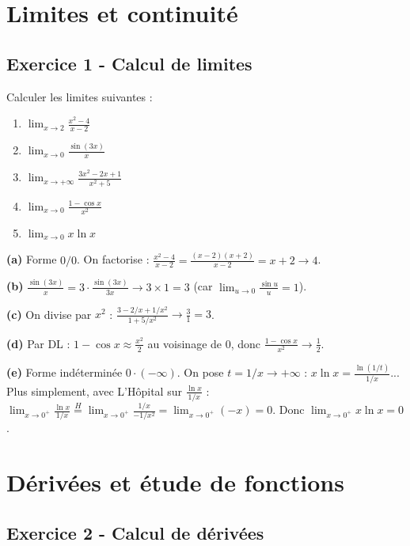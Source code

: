 \documentclass[12pt,a4paper]{article}
\begin{document}
\newpage
\section{Limites et continuité}

\subsection*{Exercice 1 - Calcul de limites \niveau{\facile}}

\begin{boiteexercice}
Calculer les limites suivantes :
\begin{enumerate}[label=(\alph*)]
  \item $\displaystyle\lim_{x\to 2}\frac{x^2-4}{x-2}$
  \item $\displaystyle\lim_{x\to 0}\frac{\sin(3x)}{x}$
  \item $\displaystyle\lim_{x\to+\infty}\frac{3x^2-2x+1}{x^2+5}$
  \item $\displaystyle\lim_{x\to 0}\frac{1-\cos x}{x^2}$
  \item $\displaystyle\lim_{x\to 0}x\ln x$
\end{enumerate}
\end{boiteexercice}

\begin{boitecorrige}
\textbf{(a)} Forme $0/0$. On factorise : $\frac{x^2-4}{x-2}=\frac{(x-2)(x+2)}{x-2}=x+2\to 4$.

\textbf{(b)} $\frac{\sin(3x)}{x}=3\cdot\frac{\sin(3x)}{3x}\to 3\times1 = 3$ (car $\lim_{u\to0}\frac{\sin u}{u}=1$).

\textbf{(c)} On divise par $x^2$ : $\frac{3-2/x+1/x^2}{1+5/x^2}\to\frac{3}{1}=3$.

\textbf{(d)} Par DL : $1-\cos x \approx \frac{x^2}{2}$ au voisinage de 0, donc $\frac{1-\cos x}{x^2}\to\frac{1}{2}$.

\textbf{(e)} Forme indéterminée $0\cdot(-\infty)$. On pose $t=1/x\to+\infty$ : $x\ln x = \frac{\ln(1/t)}{1/x}$... Plus simplement, avec L'Hôpital sur $\frac{\ln x}{1/x}$ :
$\lim_{x\to0^+}\frac{\ln x}{1/x}\stackrel{H}{=}\lim_{x\to0^+}\frac{1/x}{-1/x^2}=\lim_{x\to0^+}(-x)=0$.
Donc $\lim_{x\to0^+}x\ln x = 0$.
\end{boitecorrige}

\section{Dérivées et étude de fonctions}

\subsection*{Exercice 2 - Calcul de dérivées \niveau{\facile}}
\end{document}
